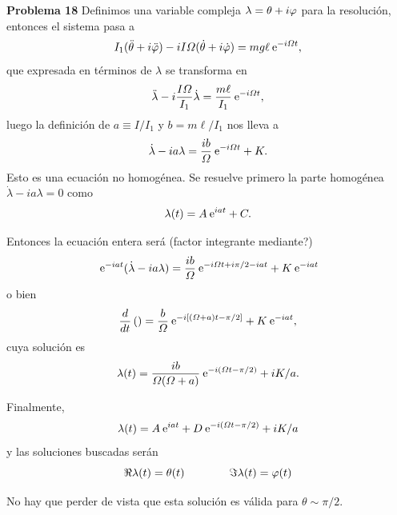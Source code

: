 \documentclass[10pt,oneside]{CBFT_book}
\begin{document}
\begin{ejemplo}{\bf Problema 18}
Definimos una variable compleja $\lambda = \theta + i \varphi $ para la resolución, entonces el sistema
pasa a 
\[
	I_1 (\ddot{\theta} + i \ddot{\varphi} ) - i I \Omega ( \dot{\theta} + i \dot{\varphi} ) = m g \ell \:\mathrm{e}^{ -i \Omega t },
\]
que expresada en términos de $\lambda$ se transforma en 
\[
	\ddot{\lambda} - i\frac{I \Omega}{I_1} \dot{\lambda} = \frac{m \ell}{I_1} \:\mathrm{e}^{-i \Omega t},
\]
luego la definición de $a \equiv I/I_1$ y $ b = m \ell / I_1 $ nos lleva a
\[
	\dot{\lambda} - i a \lambda = \frac{ib}{\Omega} \:\mathrm{e}^{-i \Omega t} + K.
\]
Esto es una ecuación no homogénea. Se resuelve primero la parte homogénea $\dot{\lambda} - ia\lambda = 0$
como 
\[
	\lambda(t) = A \:\mathrm{e}^{iat} + C.
\]

Entonces la ecuación entera será (factor integrante mediante?)
\[
	\:\mathrm{e}^{-i a t } ( \dot{\lambda} - i a \lambda ) = \frac{ib}{\Omega} \:\mathrm{e}^{-i \Omega t + i \pi/2 - i a t } + K \:\mathrm{e}^{ - i a t }
\]
o bien 
\[
	\frac{d^{\hspace{-0.05em}} {}}{d {t}^{\hspace{-0.05em}}}\left( \right) = \frac{b}{\Omega}  \:\mathrm{e}^{-i [ (\Omega + a ) t - \pi/2 ] } + K \:\mathrm{e}^{ - i a t },
\]
cuya solución es
\[
	\lambda( t ) = \frac{ib}{\Omega(\Omega+a)} \:\mathrm{e}^{-i(\Omega t - \pi/2)} + i K/a.
\]

Finalmente,
\[
	\lambda( t ) = A \:\mathrm{e}^{iat} + D \:\mathrm{e}^{-i(\Omega t - \pi/2)} + i K/a
\]
y las soluciones buscadas serán
\[
	\Re{\lambda(t)} = \theta(t) \qquad \qquad \Im{\lambda(t)} = \varphi(t)
\]

No hay que perder de vista que esta solución es válida para $\theta \sim \pi/2$.

\end{ejemplo}



\end{document}
